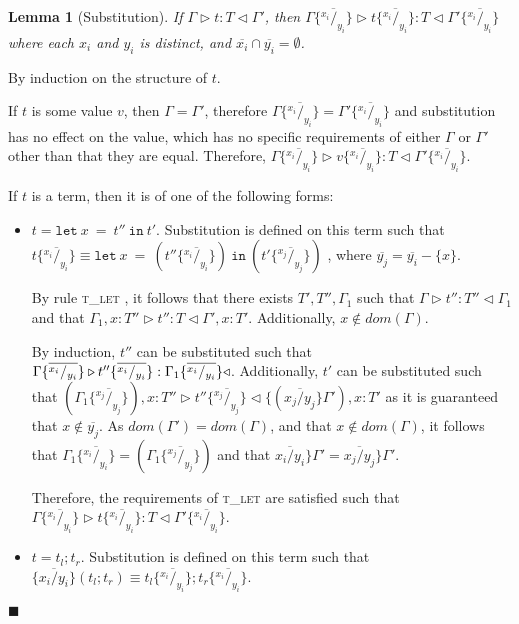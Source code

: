 \documentclass{article}
\newtheorem{lem}{Lemma}
\newcommand{\tlet}{\textsc{t\_let} }
\newcommand{\typerule}[4]{#1 \triangleright #2 : #3 \triangleleft #4}
\newcommand{\subst}[3]{#3 \{\overline{^{#1}/_{#2}}\}}
\newcommand{\lett}[3]{\mathtt{let}\:#1\:\mathtt{=}\:#2\:\mathtt{in}\:#3}
\newcommand{\qed}{$\blacksquare$}
\newenvironment{proof}{\vspace{1ex}\noindent{\bf Proof}\hspace{0.5em}}
  {\hfill\qed\vspace{1ex}}
\begin{document}
\begin{lem}[Substitution]
If $\typerule{\Gamma}{t}{T}{\Gamma'}$, then
$\typerule
{\subst{x_i}{y_i}{\Gamma}}
{\subst{x_i}{y_i}{t}}
{T}
{\subst{x_i}{y_i}{\Gamma'}}$
where each $x_i$ and $y_i$ is distinct, and $\overline{x_i} \cap \overline{y_i} = \emptyset$.
\end{lem}
\begin{proof}
By induction on the structure of $t$.

If $t$ is some value $v$, then $\Gamma = \Gamma'$, therefore
$\subst{x_i}{y_i}{\Gamma} = \subst{x_i}{y_i}{\Gamma'}$
and substitution has no effect on the value, which has no specific requirements
of either $\Gamma$ or $\Gamma'$ other than that they are equal.
Therefore, $\typerule{\subst{x_i}{y_i}{\Gamma}}{\subst{x_i}{y_i}{v}}{T}{\subst{x_i}{y_i}{\Gamma'}}$.

If $t$ is a term, then it is of one of the following forms:

\begin{itemize}
\item $t = \lett{x}{t''}{t'}$. 
Substitution is defined on this term such that \\
$\subst{x_i}{y_i}{t} \equiv 
\lett{x}{( \subst{x_i}{y_i}{t''} )}{(\subst{x_j}{y_j}{t'})}$
, where $\overline{y_j} = \overline{y_i} - \{ x \}$.

By rule \tlet, it follows
that there exists $T', T'', \Gamma_1$ such that
$\typerule{\Gamma}{t''}{T''}{\Gamma_1}$ and that
$\typerule{\Gamma_1, x : T''}{t''}{T}{\Gamma', x : T'}$.
Additionally, $x \notin dom(\Gamma)$.

By induction, $t''$ can be substituted such that 
$\typerule
{\subst{x_i}{y_i}{\Gamma}}
{\subst{x_i}{y_i}{t''}}
{\subst{x_i}{y_i}{\Gamma_1}}
$.
Additionally, $t'$ can be substituted such that
$(\subst{x_j}{y_j}{\Gamma_1}) , x : T'' \triangleright \subst{x_j}{y_j}{t''} \triangleleft \{ (\overline{x_j / y_j} \} \Gamma') , x : T'$ as it is guaranteed that $x \notin \overline{y_j}$.
As $dom(\Gamma') = dom(\Gamma)$, and that $x \notin dom(\Gamma)$, it follows that $\subst{x_i}{y_i}{\Gamma_1} = (\subst{x_j}{y_j}{\Gamma_1})$ and
that $\overline{x_i / y_i} \} \Gamma' = \overline{x_j / y_j} \} \Gamma'$.

Therefore, the requirements of \tlet are satisfied such that
$\typerule{\subst{x_i}{y_i}{\Gamma}}{\subst{x_i}{y_i}{t}}{T}{\subst{x_i}{y_i}{\Gamma'}}$.

\item $t = t_l ; t_r$.
Substitution is defined on this term such that
$\{ \overline{x_i / y_i} \} ( t_l ; t_r ) \equiv \subst{x_i}{y_i}{t_l} ; \subst{x_i}{y_i}{t_r}$.


\end{itemize}
\end{proof}
\end{document}
